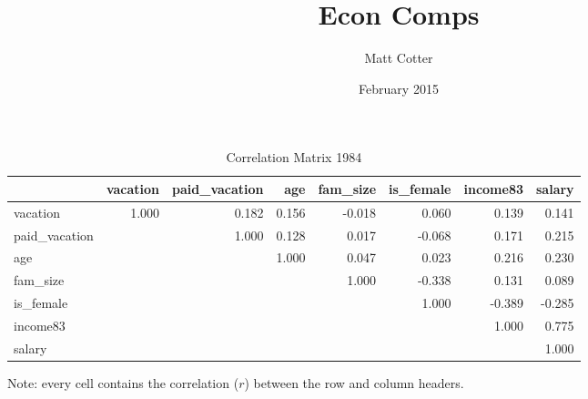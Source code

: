 \documentclass{article}
\title{Econ Comps}
\author{Matt Cotter}
\date{February 2015}
\begin{document}
    \setlength{\extrarowheight}{3pt}
    \begin{table}[h]
    \centering
    \hspace*{-1.5cm}
    \begin{tabular}{l|r|r|r|r|r|r|r}
                     & vacation & paid\_vacation &   age & fam\_size & is\_female & income83 & salary \\ \hline
      vacation       &    1.000 &          0.182 & 0.156 &    -0.018 &      0.060 &    0.139 &  0.141 \\ \hline
      paid\_vacation &          &          1.000 & 0.128 &     0.017 &     -0.068 &    0.171 &  0.215 \\ \hline
      age            &          &                & 1.000 &     0.047 &      0.023 &    0.216 &  0.230 \\ \hline
      fam\_size      &          &                &       &     1.000 &     -0.338 &    0.131 &  0.089 \\ \hline
      is\_female     &          &                &       &           &      1.000 &   -0.389 & -0.285 \\ \hline
      income83       &          &                &       &           &            &    1.000 &  0.775 \\ \hline
      salary         &          &                &       &           &            &          &  1.000
    \end{tabular}
    \hspace*{-1.5cm}
    \caption{Correlation Matrix 1984}
    \label{1984-correlation}
      Note: every cell contains the correlation ($r$) between the row and column headers.
    \end{table}
    \setlength{\extrarowheight}{3pt}
\end{document}
